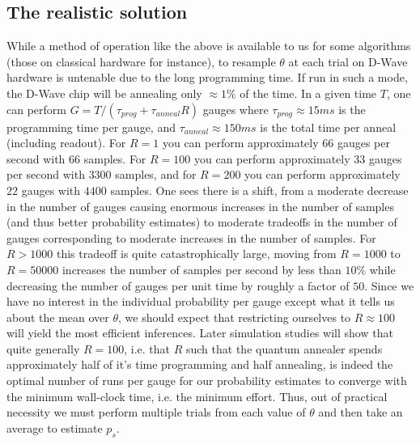 \subsection{The realistic solution}
While a method of operation like the above is available to us for some algorithms (those on classical hardware for instance), to resample $\theta$ at each trial on D-Wave hardware is untenable due to the long programming time. If run in such a mode, the D-Wave chip will be annealing only $\approx 1\%$ of the time. In a given time $T$, one can perform $G=T/(\tau_{prog}+\tau_{anneal} R)$ gauges where $\tau_{prog}\approx 15ms$ is the programming time per gauge, and $\tau_{anneal}\approx 150ms$ is the total time per anneal (including readout). For $R=1$ you can perform approximately $66$ gauges per second with $66$ samples. For $R=100$ you can perform approximately $33$ gauges per second with $3300$ samples, and for $R=200$ you can perform approximately $22$ gauges with $4400$ samples. One sees there is a shift, from a moderate decrease in the number of gauges causing enormous increases in the number of samples (and thus better probability estimates) to moderate tradeoffs in the number of gauges corresponding to moderate increases in the number of samples. For $R>1000$ this tradeoff is quite catastrophically large, moving from $R=1000$ to $R=50000$ increases the number of samples per second by less than $10\%$ while decreasing the number of gauges per unit time by roughly a factor of $50$. Since we have no interest in the individual probability per gauge except what it tells us about the mean over $\theta$, we should expect that restricting ourselves to $R\approx 100$ will yield the most efficient inferences. Later simulation studies will show that quite generally $R=100$, i.e. that $R$ such that the quantum annealer spends approximately half of it's time programming and half annealing, is indeed the optimal number of runs per gauge for our probability estimates to converge with the minimum wall-clock time, i.e. the minimum effort. Thus, out of practical necessity we must perform multiple trials from each value of $\theta$ and then take an average to estimate $p_s$.

